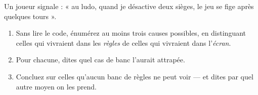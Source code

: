 \begin{nklogique}
Un joueur signale : « au ludo, quand je désactive deux sièges, le jeu se fige
après quelques tours ».

\begin{enumerate}
\item Sans lire le code, énumérez au moins trois causes possibles, en
      distinguant celles qui vivraient dans les \emph{règles} de celles qui
      vivraient dans l'\emph{écran}.
\item Pour chacune, dites quel cas de banc l'aurait attrapée.
\item Concluez sur celles qu'aucun banc de règles ne peut voir --- et dites par
      quel autre moyen on les prend.
\end{enumerate}
\end{nklogique}
